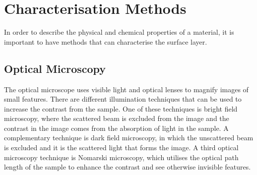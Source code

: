 \chapter{Characterisation Methods}\label{ch:methods}

In order to describe the physical and chemical properties of a material, it is important to have methods that can characterise the surface layer.

\section{Optical Microscopy}

The optical microscope uses visible light and optical lenses to magnify images of small features. There are different illumination techniques that can be used to increase the contrast from the sample. One of these techniques is bright field microscopy, where the scattered beam is excluded from the image and the contrast in the image comes from the absorption of light in the sample. A complementary technique is dark field microscopy, in which the unscattered beam is excluded and it is the scattered light that forms the image. A third optical microscopy technique is Nomarski microscopy, which utilises the optical path length of the sample to enhance the contrast and see otherwise invisible features.

